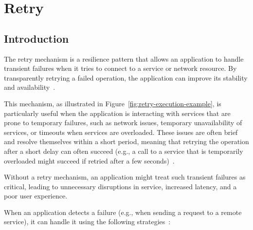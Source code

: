 \chapter{Retry}\label{ch:retry}


\section{Introduction}\label{sec:retry-context}

The retry mechanism is a resilience pattern that allows an application to handle transient failures when it tries to connect to a service or network resource.
By transparently retrying a failed operation, the application can improve its stability and availability~\cite{microsoft-retry-pattern}.

This mechanism, as illustrated in Figure~\ref{fig:retry-execution-example}, is particularly useful when the application is interacting with services that are prone to temporary failures, such as network issues, temporary unavailability of services, or timeouts when services are overloaded.
These issues are often brief and resolve themselves within a short period, meaning that retrying the operation after a short delay can often succeed (e.g., a call to a service that is temporarily overloaded might succeed if retried after a few seconds)~\cite{microsoft-retry-pattern}.

Without a retry mechanism, an application might treat such transient failures as critical,
leading to unnecessary disruptions in service, increased latency, and a poor user experience.

When an application detects a failure (e.g., when sending a request to a remote service), it can handle it using the following strategies~\cite{microsoft-retry-pattern}:

